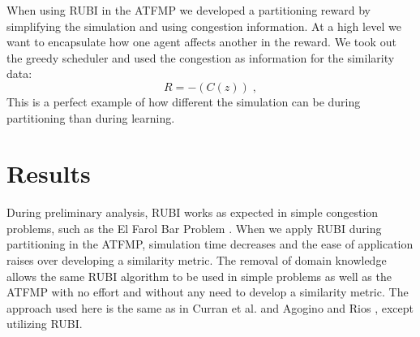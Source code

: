 \documentclass[letterpaper]{article}
\begin{document}
When using RUBI in the ATFMP we developed a partitioning reward by simplifying the simulation and using congestion information. At a high level we want to encapsulate how one agent affects another in the reward. We took out the greedy scheduler and used the congestion as information for the similarity data:
%
\begin{equation} \label{eq:RUBI ATFMP-L}
R = -(C(z))\;,
\end{equation}
%
This is a perfect example of how different the simulation can be during partitioning than during learning.


\section{Results}

During preliminary analysis, RUBI works as expected in simple congestion problems, such as the El Farol Bar Problem \cite{BarProblem}. When we apply RUBI during partitioning in the ATFMP, simulation time decreases and the ease of application raises over developing a similarity metric. The removal of domain knowledge allows the same RUBI algorithm to be used in simple problems as well as the ATFMP with no effort and without any need to develop a similarity metric. The approach used here is the same as in Curran et al. \cite{Curran:2013:AHC:2484920.2485183} and Agogino and Rios \cite{Agogino:2009:EEM:1570256.1570258,Rios}, except utilizing RUBI.

\end{document}
